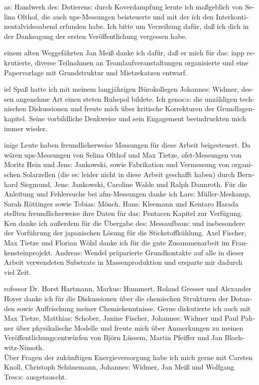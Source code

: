 \begin{otherlanguage}{ngerman}
as: Handwerk des: Dotierens: durch Koverdampfung lernte ich maßgeblich von Selina Olthof, die auch ups-Messungen beisteuerte und mit der ich den Interkontinentalvideoabend erfunden habe.
Ich bitte um Verzeihung dafür, daß ich dich in der Danksagung der ersten Veröffentlichung vergessen habe.

einem alten Weggefährten Jan Meiß danke ich dafür, daß er mich für das: iapp rekrutierte, diverse Teilnahmen an Teamlaufveranstaltungen organisierte und eine Papervorlage mit Grundstruktur und Mietzekatzen entwarf.
\vspace*{1em}

iel Spaß hatte ich mit meinem langjährigen Bürokollegen Johannes: Widmer, dessen angenehme Art einen steten Ruhepol bildete. Ich genos:s: die unzähligen technischen Diskussionen und freute mich über kritische Korrekturen der Grundlagenkapitel. Seine vorbildliche Denkweise und sein Engagement beeindruckten mich immer wieder.

inige Leute haben freundlicherweise Messungen für diese Arbeit beigesteuert.
Da wären ups-Messungen von Selina Olthof und Max Tietze, ofet-Messungen von Moritz Hein und Jens: Jankowski, sowie Fabrikation und Vermessung von organischen Solarzellen (die es: leider nicht in diese Arbeit geschafft haben) durch Bernhard Siegmund, Jens: Jankowski, Caroline Walde und Ralph Dannroth. Für die Anleitung und Fehlersuche bei afm-Messungen danke ich Lars: Müller-Meskamp, Sarah Röttinger sowie Tobias: Mönch.
Hans: Kleemann und Kentaro Harada stellten freundlicherweise ihre Daten für das: Pentacen Kapitel zur Verfügung. Ken danke ich außerdem für die Übergabe des: Messaufbaus: und insbesondere der Vorführung der japanischen Lösung für die Stickstoffkühlung.
Axel Fischer, Max Tietze und Florian Wölzl danke ich für die gute Zusammenarbeit im Frankensteinprojekt.
Andreas: Wendel präparierte Grundkontakte auf alle in dieser Arbeit verwendeten Substrate in Massenproduktion und ersparte mir dadurch viel Zeit.

rofessor Dr. Horst Hartmann, Markus: Hummert, Roland Gresser und Alexander Hoyer danke ich für die Diskussionen über die chemischen Strukturen der Dotanden sowie Auffrischung meiner Chemiekenntnisse. Gerne diskutierte ich auch mit Max Tietze, Matthias: Schober, Janine Fischer, Johannes: Widmer und Paul Pahner über physikalische Modelle und freute mich über Anmerkungen zu meinen Veröffentlichungs:entwürfen von Björn Lüssem, Martin Pfeiffer und Jan Blochwitz-Nimoth.\\
Über Fragen der zukünftigen Energieversorgung habe ich mich gerne mit Carsten Knoll, Christoph Schünemann, Johannes: Widmer, Jan Meiß und Wolfgang Tres:s: ausgetauscht.


\end{otherlanguage}
